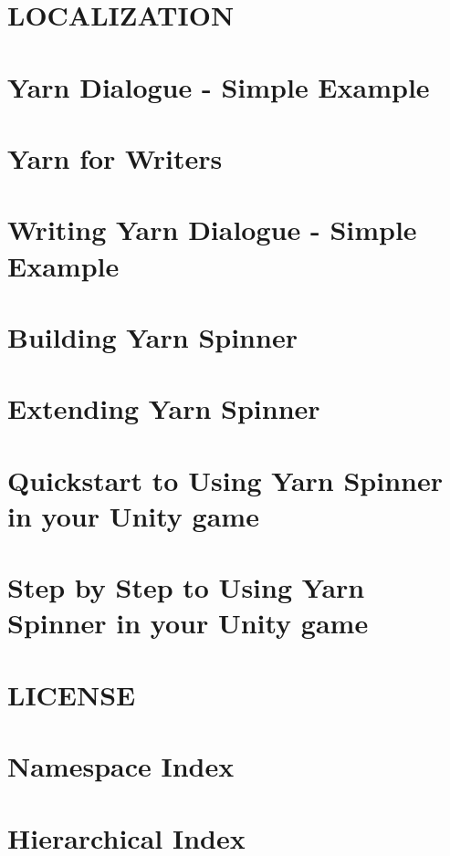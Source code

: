 \documentclass[twoside]{book}
\begin{document}
\chapter{L\-O\-C\-A\-L\-I\-Z\-A\-T\-I\-O\-N}
\label{a00014}
\hypertarget{a00014}{}

\chapter{Yarn Dialogue -\/ Simple Example}
\label{a00016}
\hypertarget{a00016}{}

\chapter{Yarn for Writers}
\label{a00018}
\hypertarget{a00018}{}

\chapter{Writing Yarn Dialogue -\/ Simple Example}
\label{a00020}
\hypertarget{a00020}{}

\chapter{Building Yarn Spinner}
\label{a00022}
\hypertarget{a00022}{}

\chapter{Extending Yarn Spinner}
\label{a00024}
\hypertarget{a00024}{}

\chapter{Quickstart to Using Yarn Spinner in your Unity game}
\label{a00026}
\hypertarget{a00026}{}

\chapter{Step by Step to Using Yarn Spinner in your Unity game}
\label{a00028}
\hypertarget{a00028}{}

\chapter{L\-I\-C\-E\-N\-S\-E}
\label{a00030}
\hypertarget{a00030}{}

\chapter{Namespace Index}

\chapter{Hierarchical Index}

\end{document}
